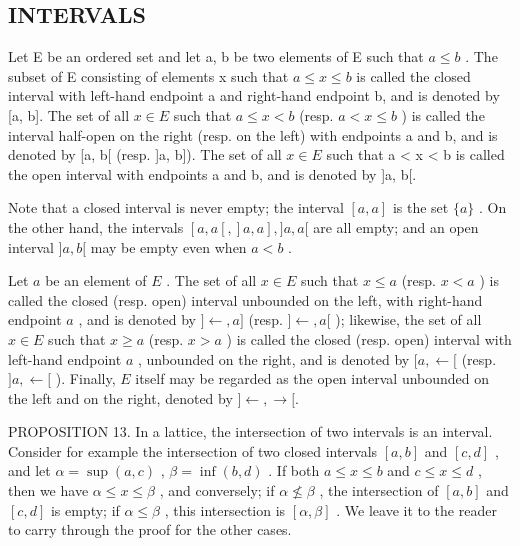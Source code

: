 \subsection{INTERVALS}

Let E be an ordered set and let a, b be two elements of E such that \(a \leqslant b\) . The subset of E consisting of elements x such that \(a \leqslant x \leqslant b\) is called the closed interval with left-hand endpoint a and right-hand endpoint b, and is denoted by {[}a, b{]}. The set of all \(x \in E\) such that \(a \leqslant x < b\) (resp. \(a < x \leqslant b\) ) is called the interval half-open on the right (resp. on the left) with endpoints a and b, and is denoted by {[}a, b{[} (resp. {]}a, b{]}). The set of all \(x \in E\) such that a \textless{} x \textless{} b is called the open interval with endpoints a and b, and is denoted by {]}a, b{[}.

Note that a closed interval is never empty; the interval \([a, a]\) is the set \(\{a\}\) . On the other hand, the intervals \([a, a[, ]a, a], ]a, a[\) are all empty; and an open interval \(]a, b[\) may be empty even when \(a < b\) .

Let \(a\) be an element of \(E\) . The set of all \(x \in E\) such that \(x \leqslant a\) (resp. \(x < a\) ) is called the closed (resp. open) interval unbounded on the left, with right-hand endpoint \(a\) , and is denoted by \(] \leftarrow, a]\) (resp. \(] \leftarrow, a[\) ); likewise, the set of all \(x \in E\) such that \(x \geqslant a\) (resp. \(x > a\) ) is called the closed (resp. open) interval with left-hand endpoint \(a\) , unbounded on the right, and is denoted by \([a, \leftarrow[\) (resp. \(]a, \leftarrow[\) ). Finally, \(E\) itself may be regarded as the open interval unbounded on the left and on the right, denoted by \(] \leftarrow, \rightarrow [.\)

PROPOSITION 13. In a lattice, the intersection of two intervals is an interval. Consider for example the intersection of two closed intervals \([a, b]\) and \([c, d]\) , and let \(\alpha = \sup (a, c)\) , \(\beta = \inf (b, d)\) . If both \(a \leqslant x \leqslant b\) and \(c \leqslant x \leqslant d\) , then we have \(\alpha \leqslant x \leqslant \beta\) , and conversely; if \(\alpha \not\leqslant \beta\) , the intersection of \([a, b]\) and \([c, d]\) is empty; if \(\alpha \leqslant \beta\) , this intersection is \([\alpha, \beta]\) . We leave it to the reader to carry through the proof for the other cases.

